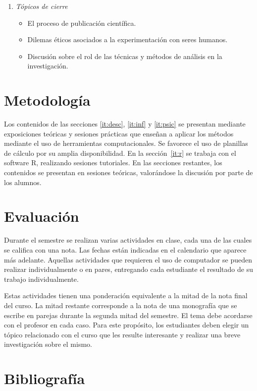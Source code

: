 \documentclass[letterpaper,11pt]{article}
\begin{document}
\begin{enumerate}
  \item \emph{T\'opicos de cierre}
  \begin{itemize}
    \item El proceso de publicaci\'on cient\'ifica.
    \item Dilemas \'eticos asociados a la experimentaci\'on con seres humanos.
    \item Discusi\'on sobre el rol de las t\'ecnicas y m\'etodos de an\'alisis en la investigaci\'on.
  \end{itemize}
\end{enumerate}


\section{Metodolog\'ia}

Los contenidos de las secciones \ref{it:desc}, \ref{it:inf} y \ref{it:psic} se presentan mediante exposiciones te\'oricas y sesiones pr\'acticas que ense\~nan a aplicar los m\'etodos mediante el uso de herramientas computacionales. Se favorece el uso de planillas de c\'alculo por su amplia disponibilidad. En la secci\'on~\ref{it:r} se trabaja con el software R, realizando sesiones tutoriales. En las secciones restantes, los contenidos se presentan en sesiones te\'oricas, valor\'andose la discusi\'on por parte de los alumnos.

\section{Evaluaci\'on}

Durante el semestre se realizan varias actividades en clase, cada una de las cuales se califica con una nota. Las fechas están indicadas en el calendario que aparece m\'as adelante. Aquellas actividades que requieren el uso de computador se pueden realizar individualmente o en pares, entregando cada estudiante el resultado de su trabajo individualmente.

Estas actividades tienen una ponderación equivalente a la mitad de la nota final del curso. La mitad restante corresponde a la nota de una monograf\'ia que se escribe en parejas durante la segunda mitad del semestre. El tema debe acordarse con el profesor en cada caso. Para este prop\'osito, los estudiantes deben elegir un t\'opico relacionado con el curso que les resulte interesante y realizar una breve investigaci\'on sobre el mismo.


\section{Bibliograf\'ia}
\end{document}
